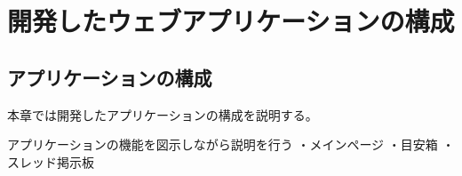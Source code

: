 \documentclass[main]{subfiles}
\begin{document}
\chapter{開発したウェブアプリケーションの構成}
\label{cha:overview}
\section{アプリケーションの構成}
本章では開発したアプリケーションの構成を説明する。

アプリケーションの機能を図示しながら説明を行う
・メインページ
・目安箱
・スレッド掲示板
\end{document}
